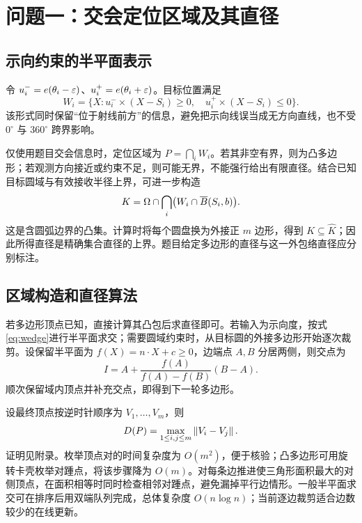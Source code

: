 \section{问题一：交会定位区域及其直径}
\subsection{示向约束的半平面表示}
令 $u_i^-=e(\theta_i-\varepsilon)$、$u_i^+=e(\theta_i+\varepsilon)$。目标位置满足
\begin{equation}
W_i=\{X:u_i^-\times(X-S_i)\ge0,\quad u_i^+\times(X-S_i)\le0\}.
\label{eq:wedge}
\end{equation}
该形式同时保留“位于射线前方”的信息，避免把示向线误当成无方向直线，也不受 $0^\circ$ 与 $360^\circ$ 跨界影响。

仅使用题目交会信息时，定位区域为 $P=\bigcap_iW_i$。若其非空有界，则为凸多边形；若观测方向接近或约束不足，则可能无界，不能强行给出有限直径。结合已知目标圆域与有效接收半径上界，可进一步构造
\begin{equation}
K=\Omega\cap\bigcap_i\bigl(W_i\cap\overline B(S_i,b)\bigr).
\label{eq:region}
\end{equation}
这是含圆弧边界的凸集。计算时将每个圆盘换为外接正 $m$ 边形，得到 $K\subseteq\widehat K$；因此所得直径是精确集合直径的上界。题目给定多边形的直径与这一外包络直径应分别标注。

\subsection{区域构造和直径算法}
若多边形顶点已知，直接计算其凸包后求直径即可。若输入为示向度，按式\eqref{eq:wedge}进行半平面求交；需要圆域约束时，从目标圆的外接多边形开始逐次裁剪。设保留半平面为 $f(X)=n\cdot X+c\ge0$，边端点 $A,B$ 分居两侧，则交点为
\begin{equation}
I=A+\frac{f(A)}{f(A)-f(B)}(B-A).
\label{eq:clip}
\end{equation}
顺次保留域内顶点并补充交点，即得到下一轮多边形。

设最终顶点按逆时针顺序为 $V_1,\ldots,V_m$，则
\begin{equation}
D(P)=\max_{1\le i,j\le m}\left\lVert V_i-V_j\right\rVert.
\label{eq:diameter}
\end{equation}
证明见附录。枚举顶点对的时间复杂度为 $O(m^2)$，便于核验；凸多边形可用旋转卡壳枚举对踵点，将该步骤降为 $O(m)$。对每条边推进使三角形面积最大的对侧顶点，在面积相等时同时检查相邻对踵点，避免漏掉平行边情形。一般半平面求交可在排序后用双端队列完成，总体复杂度 $O(n\log n)$；当前逐边裁剪适合边数较少的在线更新。

